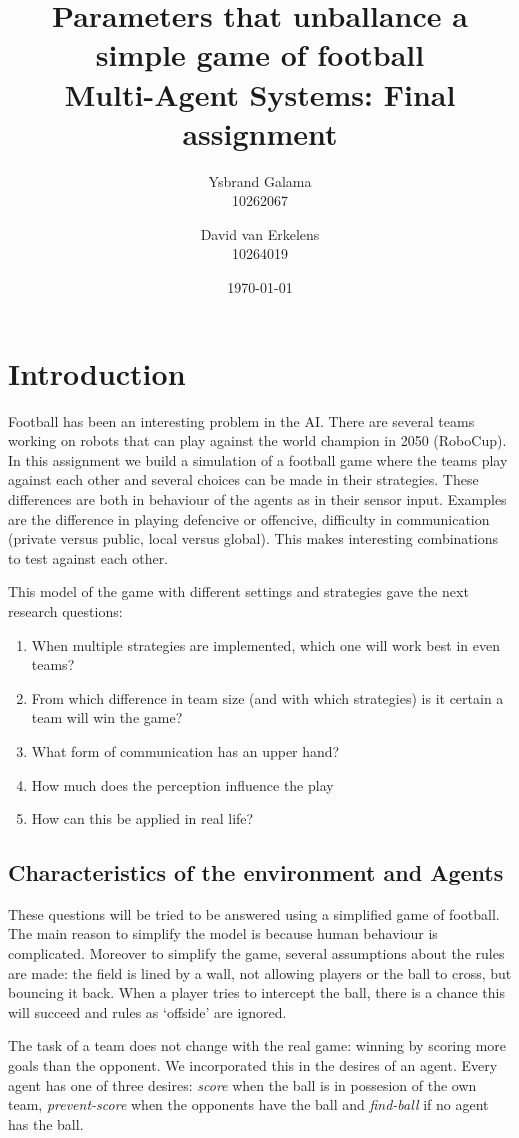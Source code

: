 \documentclass{article}
\title{Parameters that unballance a simple game of football \\ {\Large Multi-Agent Systems: Final assignment} }
\author{Ysbrand Galama \\ 10262067 \and David van Erkelens \\ 10264019}
\date{\today}
\begin{document}
\maketitle

\section{Introduction}
Football has been an interesting problem in the AI.
There are several teams working on robots that can play against the world champion in 2050 (RoboCup).
In this assignment we build a simulation of a football game where the teams play against each other and several choices can be made in their strategies.
These differences are both in behaviour of the agents as in their sensor input.
Examples are the difference in playing defencive or offencive, difficulty in communication (private versus public, local versus global).
This makes interesting combinations to test against each other.

This model of the game with different settings and strategies gave the next research questions:
\begin{enumerate}
    \item When multiple strategies are implemented, which one will work best in even teams?
    \item From which difference in team size (and with which strategies) is it certain a team will win the game?
    \item What form of communication has an upper hand?
    \item How much does the perception influence the play
    \item How can this be applied in real life?
\end{enumerate}

\subsection{Characteristics of the environment and Agents}
These questions will be tried to be answered using a simplified game of football.
The main reason to simplify the model is because human behaviour is complicated.
Moreover to simplify the game, several assumptions about the rules are made: the field is lined by a wall, not allowing players or the ball to cross, but bouncing it back.
When a player tries to intercept the ball, there is a chance this will succeed and rules as `offside' are ignored.

The task of a team does not change with the real game: winning by scoring more goals than the opponent.
We incorporated this in the desires of an agent.
Every agent has one of three desires: {\em score} when the ball is in possesion of the own team, {\em prevent-score} when the opponents have the ball and {\em find-ball} if no agent has the ball.
\end{document}
